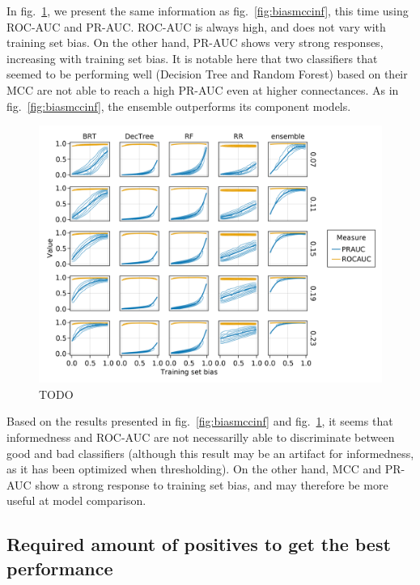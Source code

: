 \documentclass[11pt]{article}
\makeatletter
\def\maxwidth{\ifdim\Gin@nat@width>\linewidth\linewidth
\else\Gin@nat@width\fi}
\let\Oldincludegraphics\includegraphics
\renewcommand{\includegraphics}[1]{\Oldincludegraphics[width=\maxwidth]{#1}}
\makeatother
\begin{document}
In fig.~\ref{fig:biasrocpr}, we present the same information as
fig.~\ref{fig:biasmccinf}, this time using ROC-AUC and PR-AUC. ROC-AUC
is always high, and does not vary with training set bias. On the other
hand, PR-AUC shows very strong responses, increasing with training set
bias. It is notable here that two classifiers that seemed to be
performing well (Decision Tree and Random Forest) based on their MCC are
not able to reach a high PR-AUC even at higher connectances. As in
fig.~\ref{fig:biasmccinf}, the ensemble outperforms its component
models.

\begin{figure}
\hypertarget{fig:biasrocpr}{%
\centering
\includegraphics{figures/bias_roc_pr.png}
\caption{TODO}\label{fig:biasrocpr}
}
\end{figure}

Based on the results presented in fig.~\ref{fig:biasmccinf} and
fig.~\ref{fig:biasrocpr}, it seems that informedness and ROC-AUC are not
necessarilly able to discriminate between good and bad classifiers
(although this result may be an artifact for informedness, as it has
been optimized when thresholding). On the other hand, MCC and PR-AUC
show a strong response to training set bias, and may therefore be more
useful at model comparison.

\hypertarget{required-amount-of-positives-to-get-the-best-performance}{%
\subsection{Required amount of positives to get the best
performance}\label{required-amount-of-positives-to-get-the-best-performance}}
\end{document}
